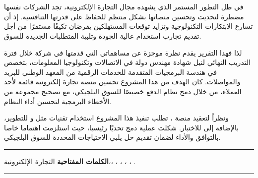 \chapter*{}

\begin{RLtext}
 \noindent\hspace{10pt} 
 في ظل التطور المستمر الذي يشهده مجال التجارة الإلكترونية، تجد الشركات نفسها مضطرة لتحديث وتحسين منصاتها بشكل منتظم للحفاظ على قدرتها التنافسية. إذ أن تسارع الابتكارات التكنولوجية وتزايد توقعات المستهلكين يفرضان تكيفًا مستمرًا من أجل تقديم تجارب استخدام عالية الجودة وتلبية المتطلبات الجديدة للسوق.

 \vspace{10pt}

 لذا فهذا التقرير يقدم نظرة موجزة عن مساهماتي التي قدمتها في شركة  خلال فترة التدريب النهائي لنيل شهادة مهندس دولة في الاتصالات وتكنولوجيا المعلومات، بتخصص في هندسة البرمجيات المتقدمة للخدمات الرقمية من المعهد الوطني للبريد والمواصلات. كان الهدف من هذا المشروع تحسين منصة تجارة إلكترونية قائمة لأحد العملاء، من خلال دمج نظام الدفع  خصيصًا للسوق البلجيكي، مع تصحيح مجموعة من الأخطاء البرمجية لتحسين أداء النظام.
 \vspace{10pt}

 ونظراً لتعقيد منصة ، تطلب تنفيذ هذا المشروع استخدام تقنيات مثل  و للتطوير، بالإضافة إلى  للاختبار. شكلت عملية دمج  تحديًا رئيسيا، حيث استلزمت اهتماما خاصا بالتوافق والأداء لضمان تقديم حل يلبي الاحتياجات المحددة للسوق البلجيكي.

 \vspace{10pt}
\end{RLtext}

\noindent\rule[2pt]{\textwidth}{0.5pt}

\noindent
\begin{RLtext}
    \textbf{الكلمات المفتاحية\LR{:}} التجارة الإلكترونية،، ، ، ، ، .
\end{RLtext}

\noindent\rule[2pt]{\textwidth}{0.5pt}
